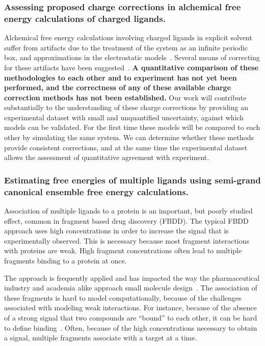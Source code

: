 \documentclass[10pt,final]{article}
\begin{document}
\subsubsection*{Assessing proposed charge corrections in alchemical free energy calculations of charged ligands.}
Alchemical free energy calculations involving charged ligands in explicit solvent suffer from artifacts due to the treatment of the system as an infinite periodic box, and approximations in the electrostatic models~\autocite{Rocklin2013b,Muddana2014a}. 
%
Several means of correcting for these artifacts have been suggested~\autocite{Reif2013a,Rocklin2013a,Lin2014a}.
%
\textbf{A quantitative comparison of these methodologies to each other and to experiment has not yet been performed, and the correctness of any of these available charge correction methods has not been established.}
%
Our work will contribute substantially to the understanding of these charge corrections by providing an experimental dataset with small and unquantified uncertainty, against which models can be validated.
%
For the first time these models will be compared to each other by simulating the same system.
%
We can determine whether these methods provide consistent corrections, and at the same time the experimental dataset allows the assessment of quantitative agreement with experiment.

\subsubsection*{Estimating free energies of multiple ligands using semi-grand canonical ensemble free energy calculations.}
Association of multiple ligands to a protein is an important, but poorly studied effect, common in fragment based drug discovery (FBDD).
%
The typical FBDD approach uses high concentrations in order to increase the signal that is experimentally observed. 
%
This is necessary because most fragment interactions with proteins are weak. 
%
High fragment concentrations often lead to multiple fragments binding to a protein at once. 

The approach is frequently applied and has impacted the way the pharmaceutical industry and academia alike approach small molecule design~\autocite{Hajduk2007a}.
%
The association of these fragments is hard to model computationally, because of the challenges associated with modeling weak interactions.
%
For instance, because of the absence of a strong signal that two compounds are ``bound'' to each other, it can be hard to define binding~\autocite{Gilson1997a}.
%
Often, because of the high concentrations necessary to obtain a signal, multiple fragments associate with a target at a time.
\end{document}
